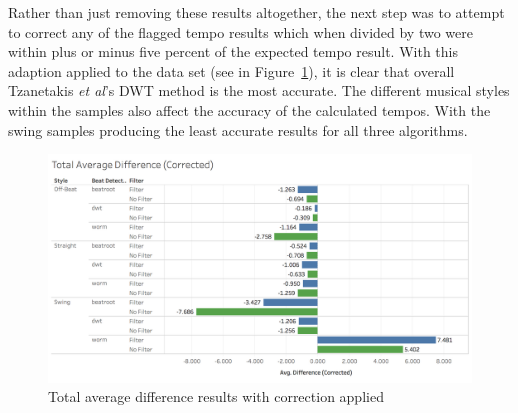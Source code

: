 \documentclass[a4paper, 11pt]{article}
\begin{document}
Rather than just removing these results altogether, the next step was to attempt to correct any of the flagged tempo results which when divided by two were within plus or minus five percent of the expected tempo result. With this adaption applied to the data set (see in Figure~\ref{fig: corAveDiff}), it is clear that overall Tzanetakis \textit{et al}'s \cite{tzane1} DWT method is the most accurate. The different musical styles within the samples also affect the accuracy of the calculated tempos. With the swing samples producing the least accurate results for all three algorithms.


\begin{figure}[htbp]
\centering
\includegraphics[scale=0.25]{images/totAveDiffCor.jpg}
\caption{Total average difference results with correction applied}
\label{fig: corAveDiff}
\end{figure}



\end{document}
